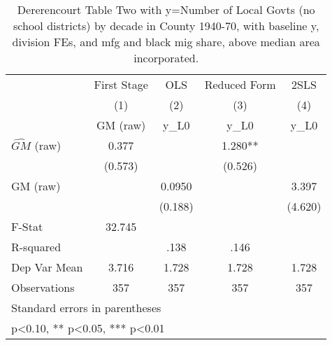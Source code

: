 \begin{table}[htbp]\centering
\def\sym#1{\ifmmode^{#1}\else\(^{#1}\)\fi}
\caption{Dererencourt Table Two with y=Number of Local Govts (no school districts) by decade in County 1940-70, with baseline y, division FEs, and mfg and black mig share, above median area incorporated.}
\begin{tabular}{l*{4}{c}}
\toprule
                    & First Stage   &         OLS   &Reduced Form   &        2SLS   \\
                    &\multicolumn{1}{c}{(1)}&\multicolumn{1}{c}{(2)}&\multicolumn{1}{c}{(3)}&\multicolumn{1}{c}{(4)}\\
                    &\multicolumn{1}{c}{GM  (raw)}&\multicolumn{1}{c}{y\_L0}&\multicolumn{1}{c}{y\_L0}&\multicolumn{1}{c}{y\_L0}\\
\midrule
$\hat{GM}$ (raw)    &       0.377   &               &       1.280** &               \\
                    &     (0.573)   &               &     (0.526)   &               \\
\addlinespace
GM  (raw)           &               &      0.0950   &               &       3.397   \\
                    &               &     (0.188)   &               &     (4.620)   \\
\midrule
F-Stat              &      32.745   &               &               &               \\
R-squared           &               &        .138   &        .146   &               \\
Dep Var Mean        &       3.716   &       1.728   &       1.728   &       1.728   \\
Observations        &         357   &         357   &         357   &         357   \\
\bottomrule
\multicolumn{5}{l}{\footnotesize Standard errors in parentheses}\\
\multicolumn{5}{l}{\footnotesize * p<0.10, ** p<0.05, *** p<0.01}\\
\end{tabular}
\end{table}
